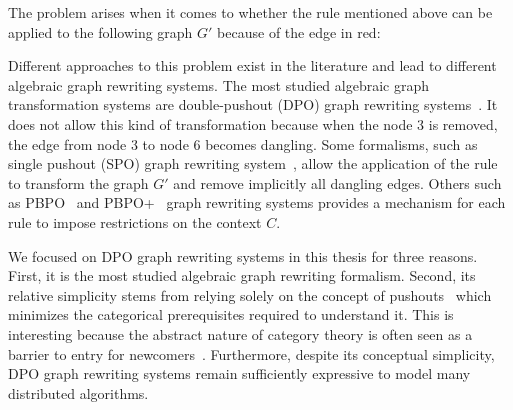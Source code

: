 The problem arises when it comes to whether the rule mentioned above can be applied to the following graph $G'$ because of the edge in red:
\begin{center}
\end{center}
Different approaches to this problem exist in the literature and lead to different algebraic graph rewriting systems.   
The most studied algebraic graph transformation systems are double-pushout (DPO) graph rewriting systems~\cite{corradini1997algebraic}. It does not allow this kind of transformation because when the node 3 is removed, the edge from node 3 to node 6 becomes dangling. Some formalisms, such as single pushout (SPO) graph rewriting system~\cite{ehrig1997algebraic}, allow the application of the rule to transform the graph $G'$ and remove implicitly all dangling edges. Others such as PBPO~\cite{corradini2019thepbpo} and PBPO+~\cite{overbeek2023graph} graph rewriting systems provides a mechanism for each rule to impose restrictions on the context $C$. 

   We focused on DPO graph rewriting systems in this thesis for three reasons. First, it is the most studied algebraic graph rewriting formalism. 
   Second, its relative simplicity stems from relying solely on the concept of pushouts~\cite{pierce1991basic} which minimizes the categorical prerequisites required to understand it. This is interesting because the abstract nature of category theory is often seen as a barrier to entry for newcomers~\cite{overbeekthesis}.
    Furthermore, despite its conceptual simplicity, DPO graph rewriting systems remain sufficiently expressive to model many distributed algorithms.



